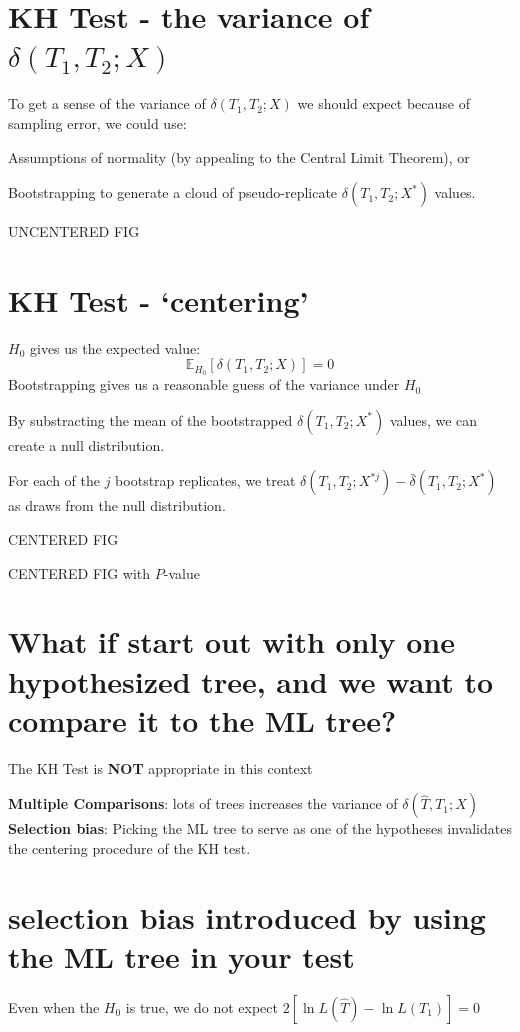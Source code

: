 \documentclass[landscape]{foils}
\begin{document}
\myNewSlide
\section*{KH Test - the variance of $\delta(T_1,T_2;X)$}
To get a sense of the variance of $\delta(T_1,T_2;X)$ we should expect because of sampling error, we could use:
\begin{compactenum}
	\item Assumptions of normality (by appealing to the Central Limit Theorem), or
	\item Bootstrapping to generate a cloud of pseudo-replicate $\delta(T_1,T_2;X^{\ast})$ values.
\end{compactenum}
\myNewSlide
UNCENTERED FIG

\myNewSlide
\section*{KH Test - `centering'}
$H_0$ gives us the expected value: $$\mathbb{E}_{H_0}\left[\delta(T_1,T_2;X)\right] = 0$$
Bootstrapping gives us a reasonable guess of the variance under $H_0$

By substracting the mean of the bootstrapped $\delta(T_1,T_2;X^{\ast})$ values, we can create a null distribution.

For each of the $j$ bootstrap replicates, we treat $\delta(T_1,T_2;X^{\ast j}) - \bar\delta(T_1,T_2;X^{\ast})$  as draws from the null distribution.

\myNewSlide
CENTERED FIG

\myNewSlide
CENTERED FIG with $P$-value


\myNewSlide
\section*{What if start out with only one hypothesized tree, and we want to compare it to the ML tree?}
The KH Test is {\bf NOT} appropriate in this context \citep[see][for discussion of this point]{GoldmanAR2000}

{\bf Multiple Comparisons}: lots of trees increases the variance of $\delta(\hat{T},T_1;X)$\\

{\bf Selection bias}: Picking the ML tree to serve as one of the hypotheses invalidates the centering procedure of the KH test.

\myNewSlide
\section*{selection bias introduced by using the ML tree in your test}
Even when the $H_0$ is true, we do not expect $2\left[\ln L(\hat{T}) - \ln L(T_1)\right]= 0$
\end{document}

